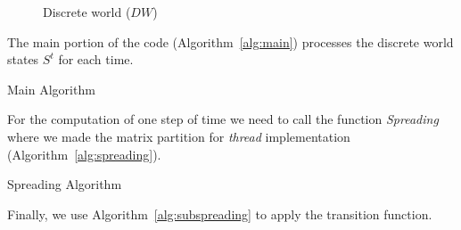\documentclass[conference]{IEEEtran}
\begin{document}
      \begin{figure}[!ht]
        \centering
        \resizebox{0.5\columnwidth}{!}{
          
        }            
        \caption{Discrete world ($DW$)}
        \label{fig:discrete_world}
      \end{figure}

      The main portion of the code (Algorithm~\ref{alg:main}) processes the discrete world 
      states $S^t$ for each time.
      
      \begin{algorithm}[h]
        \small
        \begin{algorithmic}
          \EndFor
        \end{algorithmic}
        \caption{Main Algorithm}
        \label{alg:main}
      \end{algorithm}
      
      For the computation of one step of time we need to call the function \emph{Spreading} where we made 
      the matrix partition for \emph{thread} implementation (Algorithm~\ref{alg:spreading}).
      
      \begin{algorithm}[h]
        \small
        \begin{algorithmic}
              \Else
              \EndIf
            \EndFor
            \EndFor
          \EndProcedure
        \end{algorithmic}
        \caption{Spreading Algorithm}
        \label{alg:spreading}
      \end{algorithm}
      
      Finally, we use Algorithm~\ref{alg:subspreading} to apply the transition function.
      
\end{document}
